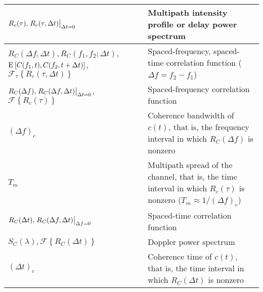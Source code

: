 \documentclass{article}
\begin{document}
\begin{xltabular}{\textwidth}{XX}
	\(R_c(\tau), \eval{R_c(\tau, \Delta t)}_{\Delta t = 0}\)                                                                                                & Multipath intensity profile or delay power spectrum                                                                                                                 \\ \hline
	\(R_C(\Delta f, \Delta t), R_C(f_1, f_2; \Delta t)\), \(\E{C(f_1,t), C(f_2, t + \Delta t)}\), \(\mathcal{F}_\tau \left\{ R_c(\tau, \Delta t) \right\}\) & Spaced-frequency, spaced-time correlation function (\(\Delta f = f_2 - f_1\))                                                                                       \\ \hline
	\(R_C(\Delta f), \eval{R_C(\Delta f, \Delta t)}_{\Delta t = 0}\), \(\mathcal{F}\left\{ R_c(\tau) \right\}\)                                             & Spaced-frequency correlation function                                                                                                                               \\ \hline
	\((\Delta f)_c\)                                                                                                                                        & Coherence bandwidth of \(c(t)\), that is, the frequency interval in which \(R_C(\Delta f)\) is nonzero                                                              \\ \hline
	\(T_m\)                                                                                                                                                 & Multipath spread of the channel, that is, the time interval in which \(R_c(\tau)\) is nonzero (\(T_m \approx 1/(\Delta f)_c \))                                     \\ \hline
	\(R_C(\Delta t), \eval{R_C(\Delta f, \Delta t)}_{\Delta f = 0}\)                                                                                        & Spaced-time correlation function                                                                                                                                    \\ \hline
	\(S_C(\lambda), \mathcal{F}\left\{ R_C (\Delta t) \right\}\)                                                                                            & Doppler power spectrum                                                                                                                                              \\ \hline
	\((\Delta t)_c\)                                                                                                                                        & Coherence time of \(c(t)\), that is, the time interval in which \(R_C(\Delta t)\) is nonzero                                                                        \\ \hline

\end{xltabular}
\end{document}
